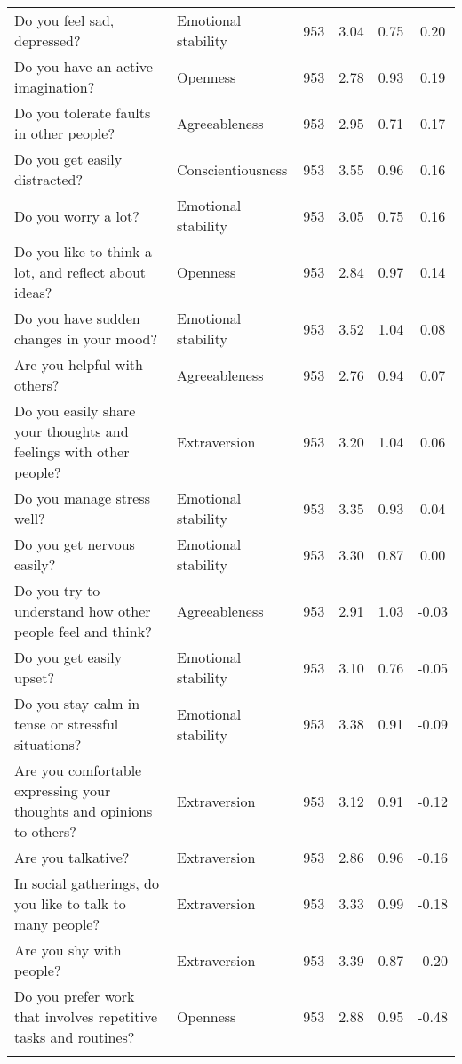 \begin{table}[htbp]
{\begin{tabular}{llcccc}
    Do you feel sad, depressed? & Emotional stability & 953   & 3.04  & 0.75  & 0.20 \\
    Do you have an active imagination? & Openness & 953   & 2.78  & 0.93  & 0.19 \\
    Do you tolerate faults in other people? & Agreeableness & 953   & 2.95  & 0.71  & 0.17 \\
    Do you get easily distracted? & Conscientiousness & 953   & 3.55  & 0.96  & 0.16 \\
    Do you worry a lot? & Emotional stability & 953   & 3.05  & 0.75  & 0.16 \\
    Do you like to think a lot, and reflect about ideas? & Openness & 953   & 2.84  & 0.97  & 0.14 \\
    Do you have sudden changes in your mood? & Emotional stability & 953   & 3.52  & 1.04  & 0.08 \\
    Are you helpful with others? & Agreeableness & 953   & 2.76  & 0.94  & 0.07 \\
    Do you easily share your thoughts and feelings with other people? & Extraversion & 953   & 3.20  & 1.04  & 0.06 \\
    Do you manage stress well? & Emotional stability & 953   & 3.35  & 0.93  & 0.04 \\
    Do you get nervous easily? & Emotional stability & 953   & 3.30  & 0.87  & 0.00 \\
    Do you try to understand how other people feel and think? & Agreeableness & 953   & 2.91  & 1.03  & -0.03 \\
    Do you get easily upset? & Emotional stability & 953   & 3.10  & 0.76  & -0.05 \\
    Do you stay calm in tense or stressful situations? & Emotional stability & 953   & 3.38  & 0.91  & -0.09 \\
    Are you comfortable expressing your thoughts and opinions to others? & Extraversion & 953   & 3.12  & 0.91  & -0.12 \\
    Are you talkative? & Extraversion & 953   & 2.86  & 0.96  & -0.16 \\
    In social gatherings, do you like to talk to many people? & Extraversion & 953   & 3.33  & 0.99  & -0.18 \\
    Are you shy with people? & Extraversion & 953   & 3.39  & 0.87  & -0.20 \\
    Do you prefer work that involves repetitive tasks and routines? & Openness & 953   & 2.88  & 0.95  & -0.48 \\
    \bottomrule
	\Tablenote{6}{Most contributive variables (represented with \textbf{bold font}) are used to interpret factor.} \\
    \end{tabular}%
	}
  \label{tab:factor2}%
\end{table}%
